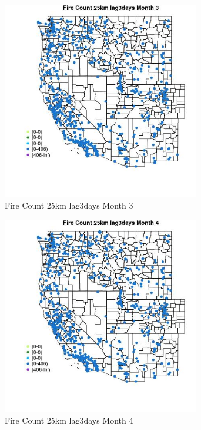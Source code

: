 \begin{figure} 
\centering  
\includegraphics[width=0.77\textwidth]{Code_Outputs/Report_ML_input_PM25_Step4_part_f_de_duplicated_aveswNAs_MapObsMo3Fire_Count_25km_lag3days.jpg} 
\caption{\label{fig:Report_ML_input_PM25_Step4_part_f_de_duplicated_aveswNAsMapObsMo3Fire_Count_25km_lag3days}Fire Count 25km lag3days Month 3} 
\end{figure} 
 

\clearpage 

\begin{figure} 
\centering  
\includegraphics[width=0.77\textwidth]{Code_Outputs/Report_ML_input_PM25_Step4_part_f_de_duplicated_aveswNAs_MapObsMo4Fire_Count_25km_lag3days.jpg} 
\caption{\label{fig:Report_ML_input_PM25_Step4_part_f_de_duplicated_aveswNAsMapObsMo4Fire_Count_25km_lag3days}Fire Count 25km lag3days Month 4} 
\end{figure} 
 

